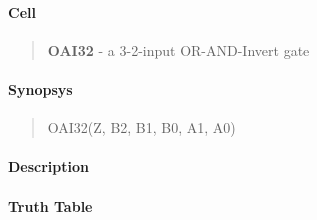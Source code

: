 \label{OAI32}
\paragraph{Cell}
\begin{quote}
    \textbf{OAI32} - a 3-2-input OR-AND-Invert gate
\end{quote}

\paragraph{Synopsys}
\begin{quote}
    OAI32(Z, B2, B1, B0, A1, A0)
\end{quote}

\paragraph{Description}

%

\paragraph{Truth Table}


